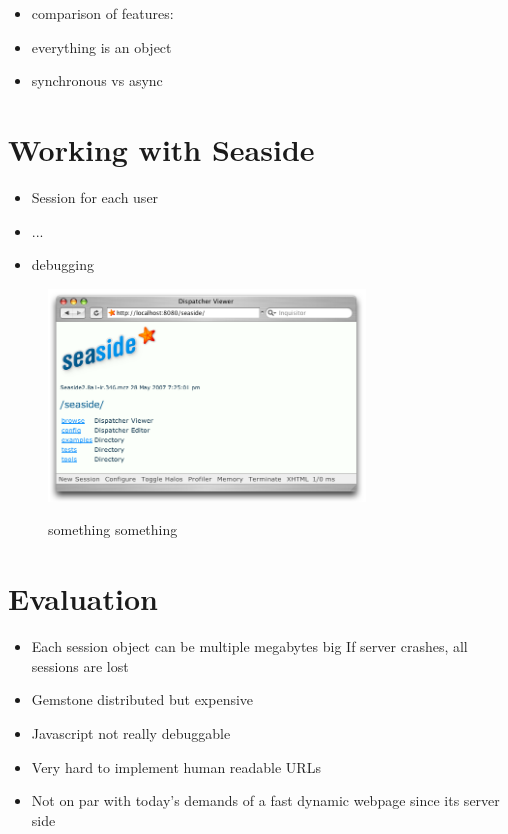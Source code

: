 \documentclass[a4paper,12pt,pagesize,headsepline,bibtotoc,titlepage]{scrartcl}
\begin{document}
\begin{itemize}
\item comparison of features:
\item everything is an object
\item synchronous vs async
\end{itemize}


\section{Working with Seaside}
\label{sec:workflow}


\begin{itemize}
\item Session for each user
\item ...
\item debugging
\end{itemize}

\begin{figure}[hbp]
\begin{center}
\includegraphics*[width=0.75\textwidth]{images/toolbar.png}\\
\caption{something something}
\label{abb:test}
\end{center}
\end{figure}

\section{Evaluation}
\label{sec:evaluation}

\begin{itemize}
\item Each session object can be multiple megabytes big If server crashes, all sessions are lost
\item Gemstone distributed but expensive
\item Javascript not really debuggable
\item Very hard to implement human readable URLs
\item Not on par with today’s demands of a fast dynamic webpage since its server side
\end{itemize}
\end{document}

